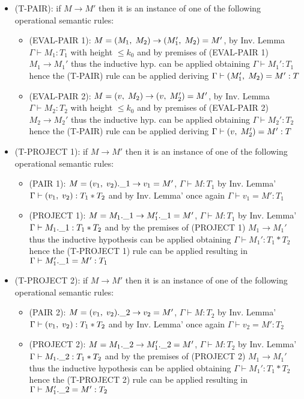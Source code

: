 \begin{itemize}
	\item (T-PAIR):
	      if $M \to M'$ then it is an instance of one of the following operational semantic rules:
	      \begin{itemize}
		      \item (EVAL-PAIR 1): $M = (M_1,\;M_2) \to (M_1',\;M_2) = M'$, by Inv. Lemma
		            $\Gamma \vdash M_1: T_1$ with height $\le k_0$ and by premises of (EVAL-PAIR 1)
		            $M_1 \to M_1'$ thus the inductive hyp. can be applied obtaining
		            $\Gamma \vdash M_1': T_1$ hence the (T-PAIR) rule can be applied deriving
		            $\Gamma \vdash (M_1',\;M_2) = M': T$
		      \item (EVAL-PAIR 2): $M = (v,\;M_2) \to (v,\;M_2') = M'$, by Inv. Lemma
		            $\Gamma \vdash M_2: T_2$ with height $\le k_0$ and by premises of (EVAL-PAIR 2)
		            $M_2 \to M_2'$ thus the inductive hyp. can be applied obtaining
		            $\Gamma \vdash M_2': T_2$ hence the (T-PAIR) rule can be applied deriving
		            $\Gamma \vdash (v,\;M_2') = M': T$
	      \end{itemize}
	\item (T-PROJECT 1):
	      if $M \to M'$ then it is an instance of one of the following operational semantic rules:
	      \begin{itemize}
		      \item (PAIR 1): $M = (v_1,\;v_2).\_1 \to v_1 = M'$, $\Gamma \vdash M: T_1$ by
		            Inv. Lemma' $\Gamma \vdash (v_1,\;v_2): T_1 \ast T_2$ and by Inv. Lemma'
		            once again $\Gamma \vdash v_1 = M': T_1$
		      \item (PROJECT 1): $M = M_1.\_1 \to M_1'.\_1 = M'$, $\Gamma \vdash M: T_1$ by
		            Inv. Lemma' $\Gamma \vdash M_1.\_1: T_1 \ast T_2$ and by the premises of
		            (PROJECT 1) $M_1 \to M_1'$ thus the inductive hypothesis can be applied obtaining
		            $\Gamma \vdash M_1': T_1 \ast T_2$ hence the (T-PROJECT 1) rule can be
		            applied resulting in $\Gamma \vdash M_1'.\_1 = M': T_1$
	      \end{itemize}
	\item (T-PROJECT 2):
	      if $M \to M'$ then it is an instance of one of the following operational semantic rules:
	      \begin{itemize}
		      \item (PAIR 2): $M = (v_1,\;v_2).\_2 \to v_2 = M'$, $\Gamma \vdash M: T_2$ by
		            Inv. Lemma' $\Gamma \vdash (v_1,\;v_2): T_1 \ast T_2$ and by Inv. Lemma'
		            once again $\Gamma \vdash v_2 = M': T_2$
		      \item (PROJECT 2): $M = M_1.\_2 \to M_1'.\_2 = M'$, $\Gamma \vdash M: T_2$ by
		            Inv. Lemma' $\Gamma \vdash M_1.\_2: T_1 \ast T_2$ and by the premises of
		            (PROJECT 2) $M_1 \to M_1'$ thus the inductive hypothesis can be applied obtaining
		            $\Gamma \vdash M_1': T_1 \ast T_2$ hence the (T-PROJECT 2) rule can be
		            applied resulting in $\Gamma \vdash M_1'.\_2 = M': T_2$
	      \end{itemize}
\end{itemize}
